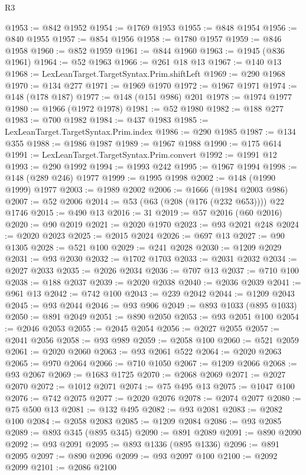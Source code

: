 \begin{lexlean}{R3}
\begin{coremodule}
@1953 := @842 @1952
@1954 := @1769 @1953
@1955 := @848 @1954
@1956 := @840 @1955
@1957 := @854 @1956
@1958 := @1780 @1957
@1959 := @846 @1958
@1960 := @852 @1959
@1961 := @844 @1960
@1963 := @1945 (@836 @1961)
@1964 := @52 @1963
@1966 := @261 @18 @13
@1967 := @140 @13
@1968 := LexLeanTarget.TargetSyntax.Prim.shiftLeft
@1969 := @290 @1968
@1970 := @134 @277
@1971 := @1969 @1970
@1972 := @1967 @1971
@1974 := @148 (@178 @187)
@1977 := @148 (@151 @986) @201
@1978 := @1974 @1977
@1980 := @1966 (@1972 @1978)
@1981 := @52 @1980
@1982 := @188 @277
@1983 := @700 @1982
@1984 := @437 @1983
@1985 := LexLeanTarget.TargetSyntax.Prim.index
@1986 := @290 @1985
@1987 := @134 @355
@1988 := @1986 @1987
@1989 := @1967 @1988
@1990 := @175 @614
@1991 := LexLeanTarget.TargetSyntax.Prim.convert
@1992 := @1991 @12
@1993 := @290 @1992
@1994 := @1993 @242
@1995 := @1967 @1994
@1998 := @148 (@289 @246) @1977
@1999 := @1995 @1998
@2002 := @148 (@1990 @1999) @1977
@2003 := @1989 @2002
@2006 := @1666 (@1984 @2003 @986)
@2007 := @52 @2006
@2014 := @53 (@63 (@208 (@176 (@232 @653)))) @22 @1746
@2015 := @490 @13
@2016 := 31
@2019 := @57 @2016 (@60 @2016)
@2020 := @90 @2019
@2021 := @2020 @1970
@2023 := @93 @2021 @248
@2024 := @2020 @2023
@2025 := @2015 @2024
@2026 := @697 @13
@2027 := @90 @1305
@2028 := @521 @100
@2029 := @241 @2028
@2030 := @1209 @2029
@2031 := @93 @2030
@2032 := @1702 @1703
@2033 := @2031 @2032
@2034 := @2027 @2033
@2035 := @2026 @2034
@2036 := @707 @13
@2037 := @710 @100
@2038 := @188 @2037
@2039 := @2020 @2038
@2040 := @2036 @2039
@2041 := @961 @13
@2042 := @742 @100
@2043 := @239 @2042
@2044 := @1209 @2043
@2045 := @93 @2044
@2046 := @93 @906
@2049 := @893 @1033 (@895 @1033)
@2050 := @891 @2049
@2051 := @890 @2050
@2053 := @93 @2051 @100
@2054 := @2046 @2053
@2055 := @2045 @2054
@2056 := @2027 @2055
@2057 := @2041 @2056
@2058 := @93 @989
@2059 := @2058 @100
@2060 := @521 @2059
@2061 := @2020 @2060
@2063 := @93 @2061 @522
@2064 := @2020 @2063
@2065 := @970 @2064
@2066 := @710 @1050
@2067 := @1209 @2066
@2068 := @93 @2067
@2069 := @1683 @1725
@2070 := @2068 @2069
@2071 := @2027 @2070
@2072 := @1012 @2071
@2074 := @75 @495 @13
@2075 := @1047 @100
@2076 := @742 @2075
@2077 := @2020 @2076
@2078 := @2074 @2077
@2080 := @75 @500 @13
@2081 := @132 @495
@2082 := @93 @2081
@2083 := @2082 @100
@2084 := @2058 @2083
@2085 := @1209 @2084
@2086 := @93 @2085
@2089 := @893 @345 (@895 @345)
@2090 := @891 @2089
@2091 := @890 @2090
@2092 := @93 @2091
@2095 := @893 @1336 (@895 @1336)
@2096 := @891 @2095
@2097 := @890 @2096
@2099 := @93 @2097 @100
@2100 := @2092 @2099
@2101 := @2086 @2100

\end{coremodule}
\end{lexlean}
